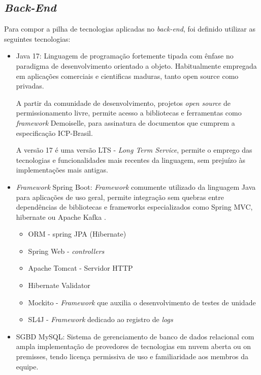 \documentclass[
    12pt,               %
    openright,          %
    oneside,
    a4paper,            %
    BIBLATEX,           %
    TODO,               %
    english,            %
    brazil              %
    ]{ifsp-spo-inf-ctds}
\begin{document}
        \subsection{\emph{Back-End}}
        \label{subcap:tecnologia-backend}
    
            Para compor a pilha de tecnologias aplicadas no \emph{back-end}, foi definido utilizar as seguintes tecnologias:

            \begin{itemize}
                \item Java 17: 
                    Linguagem de programação fortemente tipada com ênfase no paradigma de desenvolvimento orientado a objeto. Habitualmente empregada em aplicações comerciais e cientificas maduras, tanto open source como privadas.
    
                    A partir da comunidade de desenvolvimento, projetos \emph{open source} de permissionamento livre, permite acesso a bibliotecas e ferramentas como \emph{framework} Demoiselle, para assinatura de documentos que cumprem a especificação ICP-Brasil.
                    
                    A versão 17 é uma versão LTS - \emph{Long Term Service}, permite o emprego das tecnologias e funcionalidades mais recentes da linguagem, sem prejuízo às implementações mais antigas.
        
                \item \emph{Framework} Spring Boot: 
                   \emph{ Framework} comumente utilizado da linguagem Java para aplicações de uso geral, permite integração sem quebras entre dependências de bibliotecas e frameworks especializados como Spring MVC, hibernate ou Apache Kafka .
                    \begin{itemize}
                        \item ORM - spring JPA (Hibernate)
                        \item Spring Web - \emph{controllers}
                        \item Apache Tomcat - Servidor HTTP
                        \item Hibernate Validator
                        \item Mockito - \emph{Framework} que auxilia o desenvolvimento de testes de unidade
                        \item SL4J - \emph{Framework} dedicado ao registro de \emph{logs}
                    \end{itemize}
                \item SGBD MySQL:
                    Sistema de gerenciamento de banco de dados relacional com ampla implementação de provedores de tecnologias em nuvem aberta ou on premisses, tendo licença permissiva de uso e familiaridade aos membros da equipe.


\end{itemize}
\end{document}

